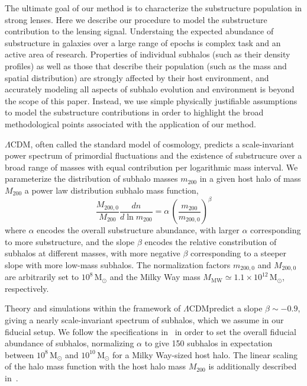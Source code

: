 \documentclass[twocolumn]{aastex62}
\newcommand{\acronym}[1]{{\small{#1}}}
\newcommand{\lcdm}{\acronym{$\Lambda$CDM}}
\newcommand{\Msun}{\textrm{M}_\odot}
\newcommand{\mtwo}{m_{200}}
\newcommand{\MMW}{M_\textrm{MW}}
\newcommand{\Mtwo}{M_{200}}
\begin{document}
The ultimate goal of our method is to characterize the substructure population in strong lenses. Here we describe our procedure to model the substructure contribution to the lensing signal. Understaing the expected abundance of substructure in galaxies over a large range of epochs is complex task and an active area of research. Properties of individual subhalos (such as their density profiles) as well as those that describe their population (such as the mass and spatial distribution) are strongly affected by their host environment, and accurately modeling all aspects of subhalo evolution and environment is beyond the scope of this paper. Instead, we use simple physically justifiable assumptions to model the substructure contributions in order to highlight the broad methodological points associated with the application of our method.

 \lcdm, often called the standard model of cosmology, predicts a scale-invariant power spectrum of primordial fluctuations and the existence of substrucure over a broad range of masses with equal contribution per logarithmic mass interval. We parameterize the distribution of subhalo masses $\mtwo$ in a given host halo of mass $\Mtwo$ a power law distribution subhalo mass function,
 \begin{equation}
 \frac{M_{200,0}}{\Mtwo}\frac{dn}{d\ln\mtwo} = \alpha\,\left(\frac{\mtwo}{m_{200, 0}}\right)^{\beta}
 \end{equation}
where $\alpha$ encodes the overall substructure abundance, with larger $\alpha$ corresponding to more substructure, and the slope $\beta$ encodes the relative constribution of subhalos at different masses, with more negative $\beta$ corresponding to a steeper slope with more low-mass subhalos. The normalization factors $m_{200, 0}$ and $M_{200, 0}$ are arbitrarily set to $10^8\,\Msun$ and the Milky Way mass $\MMW \simeq 1.1\times10^{12}\,\Msun$, respectively.

Theory and simulations within the framework of \lcdm predict a slope $\beta\sim-0.9$, giving a nearly scale-invariant spectrum of subhalos, which we assume in our fiducial setup. We follow the specifications in~\citet{2016JCAP...09..047H} in order to set the overall fiducial abundance of subhalos, normalizing $\alpha$ to give 150 subhalos in expectation between $10^{8}\,\Msun$ and $10^{10}\,\Msun$ for a Milky Way-sized host halo. The linear scaling of the halo mass function with the host halo mass $\Mtwo$ is additionally described in~\citet{2016MNRAS.457.1208H,2017MNRAS.469.1997D}.
\end{document}
